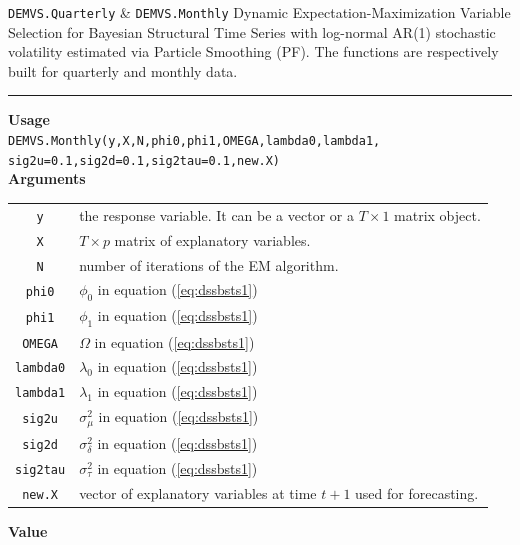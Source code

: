 \documentclass[
  12pt,
]{book}
\theoremstyle{break}
\theoremstyle{nonumberplain}
\begin{document}
\texttt{DEMVS.Quarterly} \& \texttt{DEMVS.Monthly} Dynamic
Expectation-Maximization Variable Selection for Bayesian Structural Time
Series with log-normal AR(1) stochastic volatility estimated via
Particle Smoothing (PF). The functions are respectively built for
quarterly and monthly data. \vspace{1em}

\hrule
\vspace{1em}

\textbf{Usage}\\
\texttt{DEMVS.Monthly(y,X,N,phi0,phi1,OMEGA,lambda0,lambda1,  \\                sig2u=0.1,sig2d=0.1,sig2tau=0.1,new.X)}\\
\textbf{Arguments}

\begin{small}
\begin{longtable}{ c l }
\texttt{y} &  the response variable. It can be a vector or a $T\times1$ matrix object. \\
\texttt{X} &  $T \times p$ matrix of explanatory variables.\\
\texttt{N} &  number of iterations of the EM algorithm. \\
\texttt{phi0} & $\phi_{0}$ in equation (\ref{eq:dssbsts1})\\
\texttt{phi1} &  $\phi_1$ in equation (\ref{eq:dssbsts1})\\
\texttt{OMEGA} &  $\Omega$ in equation (\ref{eq:dssbsts1})\\
\texttt{lambda0} &  $\lambda_0$ in equation (\ref{eq:dssbsts1})\\
\texttt{lambda1} &  $\lambda_1$ in equation (\ref{eq:dssbsts1})\\
\texttt{sig2u} & $\sigma^{2}_{\mu}$ in equation (\ref{eq:dssbsts1})\\
\texttt{sig2d} & $\sigma^{2}_{\delta}$ in equation (\ref{eq:dssbsts1})\\
\texttt{sig2tau} & $\sigma^{2}_{\tau}$ in equation (\ref{eq:dssbsts1})\\
\texttt{new.X} &  vector of explanatory variables at time $t+1$ used for forecasting.
\end{longtable}
\end{small}

\textbf{Value}
\end{document}
